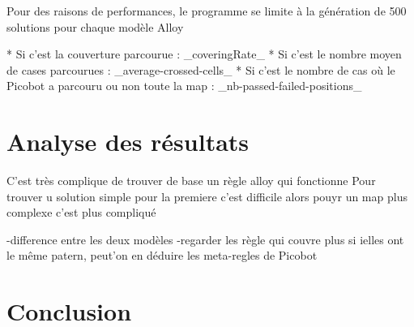 \documentclass{article}
\begin{document}
Pour des raisons de performances, le programme se limite à la génération de 500 solutions pour chaque modèle Alloy

    * Si c'est la couverture parcourue : \_coveringRate\_
    * Si c'est le nombre moyen de cases parcourues : \_average-crossed-cells\_
    * Si c'est le nombre de cas où le Picobot a parcouru ou non toute la map : \_nb-passed-failed-positions\_

\section{Analyse des résultats}
\label{sec:ana_result}

C'est très complique de trouver de base un règle alloy qui fonctionne
Pour trouver u solution simple pour la premiere c'est difficile alors pouyr un map plus complexe c'est plus compliqué

-difference entre les deux modèles 
-regarder les règle qui couvre plus si ielles ont le même patern, peut'on en déduire les meta-regles de Picobot
\section{Conclusion}
\label{sec:conclusion}
\end{document}
